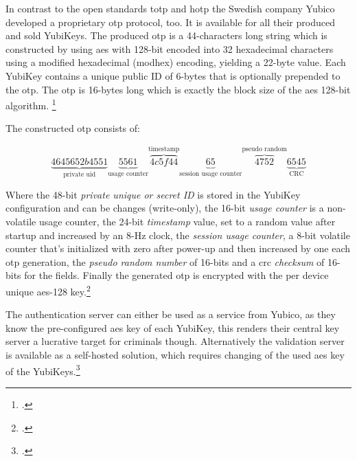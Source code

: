 In contrast to the open standards \gls{totp} and \gls{hotp} the Swedish company Yubico developed a proprietary \gls{otp} protocol, too. It is available for all their produced and sold YubiKeys. The produced \gls{otp} is a 44-characters long string which is constructed by using \gls{aes} with 128-bit encoded into 32 hexadecimal characters using a modified hexadecimal (\frqq modhex\flqq) encoding, yielding a 22-byte value. Each YubiKey contains a unique public ID of 6-bytes that is optionally prepended to the \gls{otp}. The \gls{otp} is 16-bytes long which is exactly the block size of the \gls{aes} 128-bit algorithm. \footcites[][]{10.1007/978-3-642-38004-4_17}[See][]{Jacobs:2016:STA:2953926.2953927}

The constructed \gls{otp} consists of:

\begin{equation*}
	\underbrace{4645652b4551}_\text{private uid}\underbrace{5561}_\text{usage counter}\overbrace{4c5f44}^\text{timestamp}\underbrace{65}_\text{session usage counter}\overbrace{4752}^\text{pseudo random}\underbrace{6545}_\text{CRC}
\end{equation*}

Where the 48-bit \textit{private unique or secret ID} is stored in the YubiKey configuration and can be changes (write-only), the 16-bit \textit{usage counter} is a non-volatile usage counter, the 24-bit \textit{timestamp} value, set to a random value after startup and increased by an 8-Hz clock, the \textit{session usage counter}, a 8-bit volatile counter that's initialized with zero after power-up and then increased by one each \gls{otp} generation, the \textit{pseudo random number} of 16-bits and a \gls{crc} \textit{checksum} of 16-bits for the fields. Finally the generated \gls{otp} is encrypted with the per device unique \gls{aes}-128 key.\footcites[See][8--9, 33--34]{yubico-otp}

The authentication server can either be used as a service from Yubico, as they know the pre-configured \gls{aes} key of each YubiKey, this renders their central key server a lucrative target for criminals though. Alternatively the validation server is available as a self-hosted solution, which requires changing of the used \gls{aes} key of the YubiKeys.\footcites[See][8--9]{yubico-cloud}
